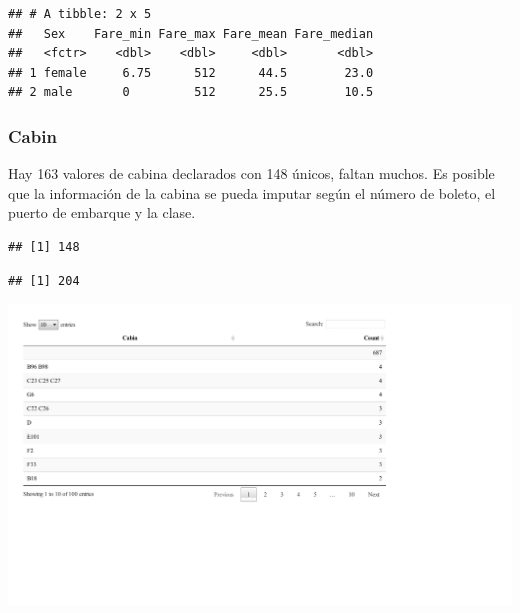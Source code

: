 \documentclass[]{article}
\newenvironment{Shaded}{\begin{snugshade}}{\end{snugshade}}
\newcommand{\KeywordTok}[1]{\textcolor[rgb]{0.13,0.29,0.53}{\textbf{#1}}}
\newcommand{\StringTok}[1]{\textcolor[rgb]{0.31,0.60,0.02}{#1}}
\newcommand{\OperatorTok}[1]{\textcolor[rgb]{0.81,0.36,0.00}{\textbf{#1}}}
\newcommand{\NormalTok}[1]{#1}
\begin{document}
\begin{Shaded}
\end{Shaded}

\begin{verbatim}
## # A tibble: 2 x 5
##   Sex    Fare_min Fare_max Fare_mean Fare_median
##   <fctr>    <dbl>    <dbl>     <dbl>       <dbl>
## 1 female     6.75      512      44.5        23.0
## 2 male       0         512      25.5        10.5
\end{verbatim}

\subsubsection{Cabin}\label{cabin}

Hay 163 valores de cabina declarados con 148 únicos, faltan muchos. Es
posible que la información de la cabina se pueda imputar según el número
de boleto, el puerto de embarque y la clase.

\begin{Shaded}
\end{Shaded}

\begin{verbatim}
## [1] 148
\end{verbatim}

\begin{verbatim}
## [1] 204
\end{verbatim}

\includegraphics{titanicDataClean_files/figure-latex/cabin-1.pdf}
\end{document}
